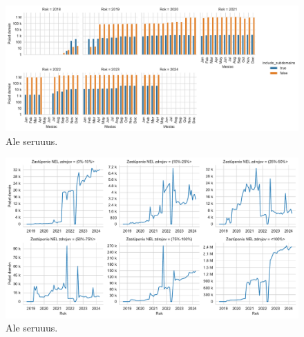 \pagebreak


\begin{figure}[!htb]
\begin{center}
 \includegraphics[scale=0.525]{obrazky-figures/httparchive_nel_config_is_dist.pdf}
 \caption{\centering Ale seruuus.}
 \label{fig:httparchive-nel-config-is-dist}
\end{center}
\end{figure}

\pagebreak


\begin{figure}[!htb]
\begin{center}
 \includegraphics[scale=0.56]{obrazky-figures/httparchive_nel_monitored_resources_percentage_dist.pdf}
 \caption{\centering Ale seruuus.}
 \label{fig:httparchive-nel-monitored-resources-precentage-dist}
\end{center}
\end{figure}

\pagebreak


